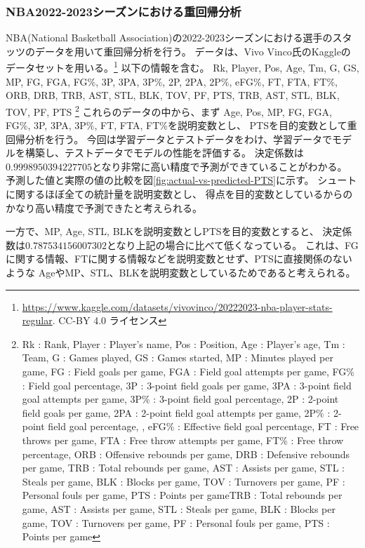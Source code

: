 \documentclass[../../../main]{subfiles}
\begin{document}
\subsubsection{NBA2022-2023シーズンにおける重回帰分析}
NBA(National Basketball Association)の2022-2023シーズンにおける選手のスタッツのデータを用いて重回帰分析を行う。
データは、Vivo Vinco氏のKaggleのデータセットを用いる。\footnote{
	\url{https://www.kaggle.com/datasets/vivovinco/20222023-nba-player-stats-regular}.
	CC-BY 4.0 ライセンス
}
以下の情報を含む。 Rk,
Player, Pos, Age, Tm, G, GS, MP, FG, FGA, FG\%, 3P, 3PA, 3P\%, 2P, 2PA, 2P\%, eFG\%, FT, FTA, FT\%, ORB, DRB, TRB, AST, STL, BLK, TOV, PF, PTS, TRB, AST, STL, BLK, TOV, PF, PTS
\footnote{
	Rk : Rank,
	Player : Player's name,
	Pos : Position,
	Age : Player's age,
	Tm : Team,
	G : Games played,
	GS : Games started,
	MP : Minutes played per game,
	FG : Field goals per game,
	FGA : Field goal attempts per game,
	FG\% : Field goal percentage,
	3P : 3-point field goals per game,
	3PA : 3-point field goal attempts per game,
	3P\% : 3-point field goal percentage,
	2P : 2-point field goals per game,
	2PA : 2-point field goal attempts per game,
	2P\% : 2-point field goal percentage, ,
	eFG\% : Effective field goal percentage,
	FT : Free throws per game,
	FTA : Free throw attempts per game,
	FT\% : Free throw percentage,
	ORB : Offensive rebounds per game,
	DRB : Defensive rebounds per game,
	TRB : Total rebounds per game,
	AST : Assists per game,
	STL : Steals per game,
	BLK : Blocks per game,
	TOV : Turnovers per game,
	PF : Personal fouls per game,
	PTS : Points per gameTRB : Total rebounds per game,
	AST : Assists per game,
	STL : Steals per game,
	BLK : Blocks per game,
	TOV : Turnovers per game,
	PF : Personal fouls per game,
	PTS : Points per game
}
これらのデータの中から、まず
Age, Pos, MP, FG, FGA, FG\%, 3P, 3PA, 3P\%, FT, FTA, FT\%を説明変数とし、
PTSを目的変数として重回帰分析を行う。
今回は学習データとテストデータをわけ、学習データでモデルを構築し、テストデータでモデルの性能を評価する。
決定係数は$0.9998950394227705$となり非常に高い精度で予測ができていることがわかる。
予測した値と実際の値の比較を図\ref{fig:actual-vs-predicted-PTS}に示す。
シュートに関するほぼ全ての統計量を説明変数とし、
得点を目的変数としているからのかなり高い精度で予測できたと考えられる。


一方で、MP, Age, STL, BLKを説明変数としPTSを目的変数とすると、
決定係数は$0.787534156007302$となり上記の場合に比べて低くなっている。
これは、FGに関する情報、FTに関する情報などを説明変数とせず、PTSに直接関係のないような
AgeやMP、STL、BLKを説明変数としているためであると考えられる。

\end{document}

